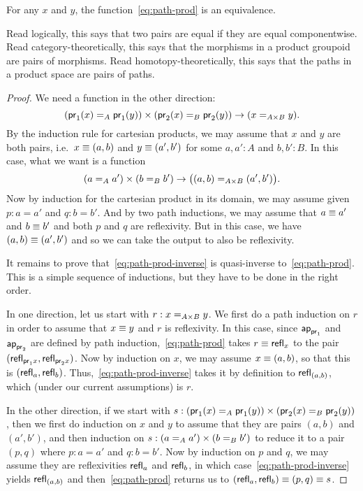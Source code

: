 \begin{thm}\label{thm:path-prod}
  For any $x$ and $y$, the function~\eqref{eq:path-prod} is an equivalence.
\end{thm}

Read logically, this says that two pairs are equal if they are equal
componentwise.  Read category-theoretically, this says that the
morphisms in a product groupoid are pairs of morphisms.  Read
homotopy-theoretically, this says that the paths in a product
space are pairs of paths.

\begin{proof}
  We need a function in the other direction:
  \begin{equation}
    (\id[A]{\proj1(x)}{\proj1(y)}) \times (\id[B]{\proj2(x)}{\proj2(y)}) \to (\id[A\times B]{x}{y}). \label{eq:path-prod-inverse}
  \end{equation}
  By the induction rule for cartesian products, we may assume that $x$ and $y$ are both pairs, i.e.\ $x\jdeq (a,b)$ and $y\jdeq (a',b')$ for some $a,a':A$ and $b,b':B$.
  In this case, what we want is a function
  \begin{equation*}
    (\id[A]{a}{a'}) \times (\id[B]{b}{b'}) \to \big(\id[A\times B]{(a,b)}{(a',b')}\big).
  \end{equation*}
  Now by induction for the cartesian product in its domain, we may assume given $p:a=a'$ and $q:b=b'$.
  And by two path inductions, we may assume that $a\jdeq a'$ and $b\jdeq b'$ and both $p$ and $q$ are reflexivity.
  But in this case, we have $(a,b)\jdeq(a',b')$ and so we can take the output to also be reflexivity.

  It remains to prove that~\eqref{eq:path-prod-inverse} is quasi-inverse to~\eqref{eq:path-prod}.
  This is a simple sequence of inductions, but they have to be done in the right order.

  In one direction, let us start with $r:\id[A\times B]{x}{y}$.
  We first do a path induction on $r$ in order to assume that $x\jdeq y$ and $r$ is reflexivity.
  In this case, since $\apfunc{\proj1}$ and $\apfunc{\proj2}$ are defined by path induction,~\eqref{eq:path-prod} takes $r\jdeq \refl{x}$ to the pair $(\refl{\proj1x},\refl{\proj2x})$.
  Now by induction on $x$, we may assume $x\jdeq (a,b)$, so that this is $(\refl a, \refl b)$.
  Thus,~\eqref{eq:path-prod-inverse} takes it by definition to $\refl{(a,b)}$, which (under our current assumptions) is $r$.
  
  In the other direction, if we start with $s:(\id[A]{\proj1(x)}{\proj1(y)}) \times (\id[B]{\proj2(x)}{\proj2(y)})$, then we first do induction on $x$ and $y$ to assume that they are pairs $(a,b)$ and $(a',b')$, and then induction on $s:(\id[A]{a}{a'}) \times (\id[B]{b}{b'})$ to reduce it to a pair $(p,q)$ where $p:a=a'$ and $q:b=b'$.
  Now by induction on $p$ and $q$, we may assume they are reflexivities $\refl a$ and $\refl b$, in which case~\eqref{eq:path-prod-inverse} yields $\refl{(a,b)}$ and then~\eqref{eq:path-prod} returns us to $(\refl a,\refl b)\jdeq (p,q)\jdeq s$.
\end{proof}


